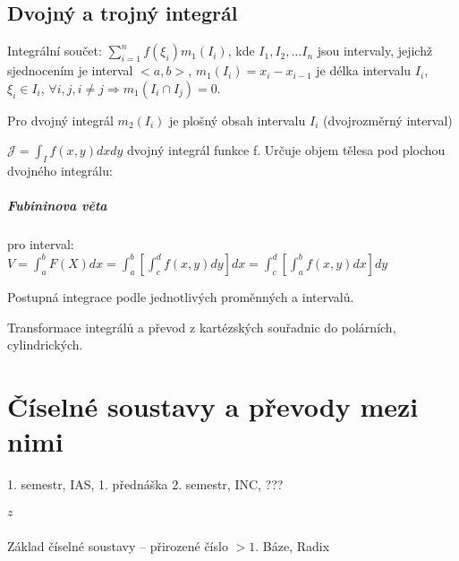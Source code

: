 \documentclass[a4paper, 11pt]{report}
\begin{document}
\section{Dvojný a trojný integrál}

Integrální součet: $\sum\limits_{i = 1}^n f(\xi_i) m_1(I_i)$, kde $I_1, I_2, \dots I_n$ jsou intervaly, jejichž sjednocením je interval $<a,b>$, $m_1(I_i) = x_i - x_{i-1}$ je délka intervalu $I_i$, $\xi_i \in I_i$, $\forall i,j, i \neq j \Rightarrow m_1(I_i \cap I_j) = 0$.

Pro dvojný integrál $m_2(I_i)$ je plošný obsah intervalu $I_i$ (dvojrozměrný interval)

$\mathcal{J} = \int_I f(x,y) dx dy$ dvojný integrál funkce f. Určuje objem tělesa pod plochou dvojného integrálu:

\paragraph{Fubininova věta} pro interval: $V = \int_a^b F(X) dx = \int_a^b \left[ \int_c^d f(x,y) dy \right] dx = \int_c^d \left[ \int_a^b f(x,y) dx \right] dy$

Postupná integrace podle jednotlivých proměnných a intervalů.

Transformace integrálů a převod z kartézských souřadnic do polárních, cylindrických.
































\chapter{Číselné soustavy a převody mezi nimi} \label{cha:18}

1. semestr, IAS, 1. přednáška
2. semestr, INC, ???

\paragraph{$z$} Základ číselné soustavy -- přirozené číslo $ > 1$. Báze, Radix
\end{document}

